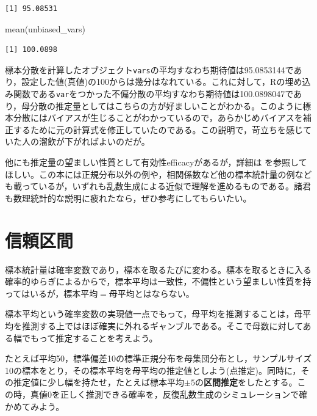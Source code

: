 \documentclass[
  a4paper,
]{ltjsbook}
\newenvironment{Shaded}{\begin{snugshade}}{\end{snugshade}}
\newcommand{\FunctionTok}[1]{\textcolor[rgb]{0.28,0.35,0.67}{#1}}
\newcommand{\NormalTok}[1]{\textcolor[rgb]{0.00,0.23,0.31}{#1}}
\begin{document}
\begin{verbatim}
[1] 95.08531
\end{verbatim}

\begin{Shaded}
\begin{Highlighting}[]
\FunctionTok{mean}\NormalTok{(unbiased\_vars)}
\end{Highlighting}
\end{Shaded}

\begin{verbatim}
[1] 100.0898
\end{verbatim}

標本分散を計算したオブジェクト\texttt{vars}の平均すなわち期待値は95.0853144であり，設定した値(真値)の100からは幾分はなれている。これに対して，Rの埋め込み関数である\texttt{var}をつかった不偏分散の平均すなわち期待値は100.0898047であり，母分散の推定量としてはこちらの方が好ましいことがわかる。このように標本分散にはバイアスが生じることがわかっているので，あらかじめバイアスを補正するために元の計算式を修正していたのである。この説明で，苛立ちを感じていた人の溜飲が下がればよいのだが。

他にも推定量の望ましい性質として有効性efficacyがあるが，詳細は
\textcite{kosugi2023}
を参照してほしい。この本には正規分布以外の例や，相関係数など他の標本統計量の例なども載っているが，いずれも乱数生成による近似で理解を進めるものである。諸君も数理統計的な説明に疲れたなら，ぜひ参考にしてもらいたい。

\section{信頼区間}\label{ux4fe1ux983cux533aux9593}

標本統計量は確率変数であり，標本を取るたびに変わる。標本を取るときに入る確率的ゆらぎによるからで，標本平均は一致性，不偏性という望ましい性質を持ってはいるが，標本平均\(=\)母平均とはならない。

標本平均という確率変数の実現値一点でもって，母平均を推測することは，母平均を推測する上ではほぼ確実に外れるギャンブルである。そこで母数に対してある幅でもって推定することを考えよう。

たとえば平均50，標準偏差10の標準正規分布を母集団分布とし，サンプルサイズ10の標本をとり，その標本平均を母平均の推定値としよう(点推定)。同時に，その推定値に少し幅を持たせ，たとえば標本平均\(\pm 5\)の\textbf{区間推定}をしたとする。この時，真値\(0\)を正しく推測できる確率を，反復乱数生成のシミュレーションで確かめてみよう。
\end{document}
